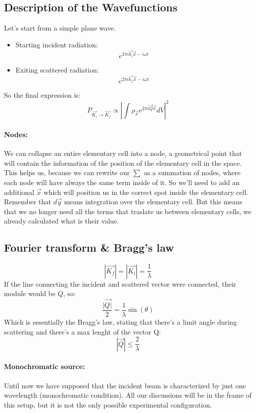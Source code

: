 \subsection{Description of the Wavefunctions}

Let's start from a simple plane wave.
\begin{itemize}
    \item Starting incident radiation:
    \begin{equation}
        e^{2\pi i \vec{k_i}\vec{x}-i\omega t}
    \end{equation}
    \item Exiting scattered radiation:
    \begin{equation}
        e^{2\pi i \vec{k_f}\vec{x}-i\omega t}
    \end{equation}
\end{itemize}
So the final expression is:
\begin{equation}
    P_{\vec{K_i} \rightarrow \vec{K_f}} \propto \left|\int \rho_{\vec{x}} e^{2\pi i \vec{Q} \vec{x}}dV\right|^2
\end{equation}

\paragraph{Nodes:} We can collapse an entire elementary cell into a node, a geometrical point that will contain the information of the position of the elementary cell in the space. This helps us, because we can rewrite our $\sum$ as a summation of nodes, where each node will have always the same term inside of it. So we'll need to add an additional $\vec{x}$ which will position us in the correct spot inside the elementary cell. Remember that $d\vec{y}$ means integration over the elementary cell. But this means that we no longer need all the terms that traslate us between elementary cells, we already calculated what is their value.

\subsection{Fourier transform \& Bragg's law}

\begin{equation}
    |\vec{K_f}| = |\vec{K_i}| = \frac{1}{\lambda}
\end{equation}
If the line connecting the incident and scattered vector were connected, their module would be $Q$, so:
\begin{equation}
    \frac{|\vec{Q|}}{2} = \frac{1}{\lambda}\sin(\theta)
\end{equation}
Which is essentially the Bragg's law, stating that there's a limit angle during scattering and there's a max lenght of the vector Q:
\begin{equation}
    |\vec{Q}| \leq \frac{2}{\lambda}
\end{equation}

\paragraph{Monochromatic source:} Until now we have supposed that the incident beam is characterized by just one wavelength (monochromatic condition). All our discussions will be in the frame of this setup, but it is not the only possible experimental configuration.